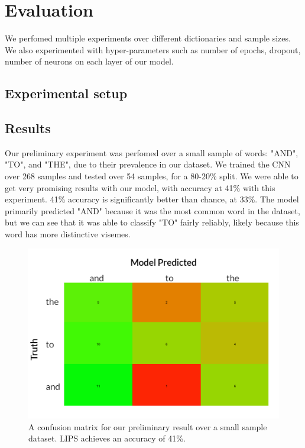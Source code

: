 \documentclass{article}
\begin{document}
\section{Evaluation}

We perfomed multiple experiments over different dictionaries and sample sizes. We also experimented with hyper-parameters such as number of epochs, dropout, number of neurons on each layer of our model.

\subsection{Experimental setup}

\subsection{Results}

Our preliminary experiment was perfomed over a small sample of words: "AND", "TO", and "THE", due to their prevalence in our dataset. We trained the CNN over 268 samples and tested over 54 samples, for a 80-20\% split. We were able to get very promising results with our model, with accuracy at 41\% with this experiment. 41\% accuracy is significantly better than chance, at 33\%. The model primarily predicted "AND" because it was the most common word in the dataset, but we can see that it was able to classify "TO" fairly reliably, likely because this word has more distinctive visemes.

   \begin{figure}[h!]
 \centering
  \includegraphics{result1}
 \caption{A confusion matrix for our preliminary result over a small sample dataset. LIPS achieves an accuracy of 41\%.}
 \end{figure}
\end{document}
